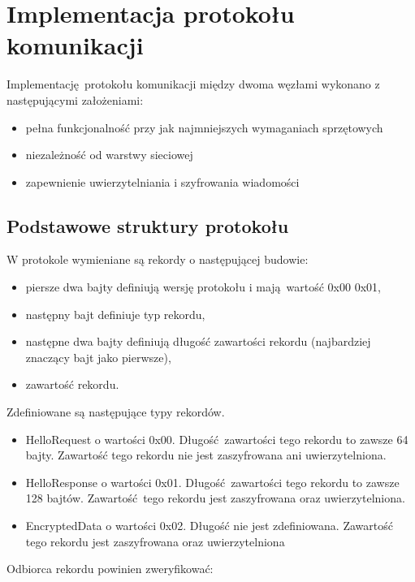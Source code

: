 \chapter{Implementacja protokołu komunikacji}
\label{cha:implementacja}

Implementację protokołu komunikacji między dwoma węzłami wykonano z następującymi założeniami:

\begin{itemize}
\item pełna funkcjonalność przy jak najmniejszych wymaganiach sprzętowych
\item niezależność od warstwy sieciowej
\item zapewnienie uwierzytelniania i szyfrowania wiadomości
\end{itemize}

\section{Podstawowe struktury protokołu}
\label{sec:proto}

W protokole wymieniane są rekordy o następującej budowie:

\begin{itemize}
\item piersze dwa bajty definiują wersję protokołu i mają wartość 0x00 0x01,
\item następny bajt definiuje typ rekordu,
\item następne dwa bajty definiują długość zawartości rekordu (najbardziej znaczący bajt jako pierwsze),
\item zawartość rekordu.
\end{itemize}

Zdefiniowane są następujące typy rekordów.

\begin{itemize}
\item HelloRequest o wartości 0x00. Długość zawartości tego rekordu to zawsze 64 bajty. Zawartość tego rekordu nie jest zaszyfrowana ani uwierzytelniona.
\item HelloResponse o wartości 0x01. Długość zawartości tego rekordu to zawsze 128 bajtów. Zawartość tego rekordu jest zaszyfrowana oraz uwierzytelniona.
\item EncryptedData o wartości 0x02. Długość nie jest zdefiniowana. Zawartość tego rekordu jest zaszyfrowana oraz uwierzytelniona
\end{itemize}

Odbiorca rekordu powinien zweryfikować:

